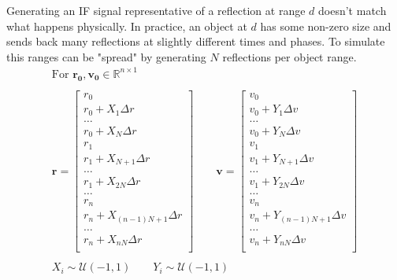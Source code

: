 \documentclass{article}
\begin{document}
Generating an IF signal representative of a reflection at range $d$ doesn't match
what happens physically. In practice, an object at $d$ has some non-zero size
and sends back many reflections at slightly different times and phases. To
simulate this ranges can be "spread" by generating $N$ reflections per object
range.
\begin{gather*}
    \text{For } \mathbf{r_0}, \mathbf{v_0} \in \mathbb{R}^{n \times 1} \\\\
    \mathbf{r} = \begin{bmatrix}
        r_0 \\
        r_0 + X_1\Delta r \\
        \dots \\
        r_0 + X_N\Delta r \\
        r_1 \\
        r_1 + X_{N + 1}\Delta r \\
        \dots \\
        r_1 + X_{2N}\Delta r \\
        \dots \\
        r_n \\
        r_n + X_{(n - 1)N + 1}\Delta r \\
        \dots \\
        r_n + X_{nN}\Delta r \\
    \end{bmatrix} \qquad
    \mathbf{v} = \begin{bmatrix}
        v_0 \\
        v_0 + Y_1\Delta v \\
        \dots \\
        v_0 + Y_N\Delta v \\
        v_1 \\
        v_1 + Y_{N + 1}\Delta v \\
        \dots \\
        v_1 + Y_{2N}\Delta v \\
        \dots \\
        v_n \\
        v_n + Y_{(n - 1)N + 1}\Delta v \\
        \dots \\
        v_n + Y_{nN}\Delta v \\
    \end{bmatrix} \\\\
    X_i \sim \mathcal{U}(-1, 1) \qquad
    Y_i \sim \mathcal{U}(-1, 1)
\end{gather*}
\end{document}
